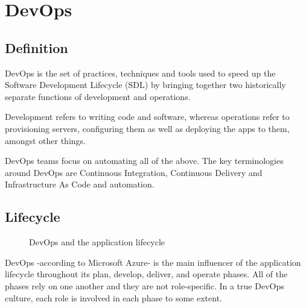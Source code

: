 \section{DevOps}

\subsection{Definition}
DevOps is the set of practices, techniques and tools used to speed up the Software Development Lifecycle (SDL) by bringing together two historically separate functions of development and operations.

Development refers to writing code and software, whereas operations refer to provisioning servers, configuring them as well as deploying the apps to them, amongst other things.

DevOps teams focus on automating all of the above.
The key terminologies around DevOps are Continuous Integration, Continuous Delivery and Infrastructure As Code and automation.

\subsection{Lifecycle}
\begin{figure}[H]
    \centering
    \caption{DevOps and the application lifecycle}
    \label{fig:devops-lifecycle}
\end{figure}

DevOps -according to Microsoft Azure- is the main influencer of the application lifecycle throughout its plan, develop, deliver, and operate phases. All of the phases rely on one another and they are not role-specific. In a true DevOps culture, each role is involved in each phase to some extent. \cite{devops}

